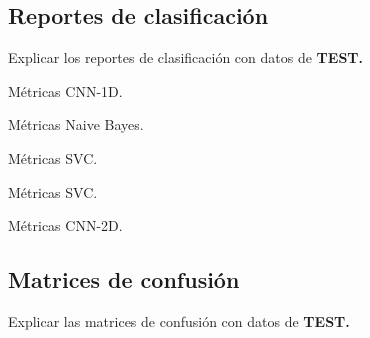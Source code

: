   \subsection{Reportes de clasificación}

    Explicar los reportes de clasificación con datos de \textbf{TEST.}

    \begin{table}[H]
      \centering
      \caption{Métricas CNN-1D.}
      \label{CNN1DMetrics}
    \end{table}

    \begin{table}[H]
      \centering
      \caption{Métricas Naive Bayes.}
      \label{NBMetrics}
    \end{table}

    \begin{table}[H]
      \centering
      \caption{Métricas SVC.}
      \label{SVCDMetrics}
    \end{table}

    \begin{table}[H]
      \centering
      \caption{Métricas SVC.}
      \label{SVCDMetrics}
    \end{table}

    \begin{table}[H]
      \centering
      \caption{Métricas CNN-2D.}
      \label{CNN2DMetrics}
    \end{table}

  \subsection{Matrices de confusión}

    Explicar las matrices de confusión con datos de \textbf{TEST.}

